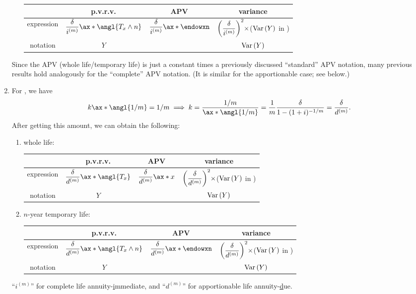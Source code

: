 \begin{enumerate}
\begin{enumerate}
\begin{tabular}{cccc}
\toprule
&p.v.r.v.&APV&variance\\
\midrule
expression&\(\displaystyle \frac{\delta}{i^{(m)}}\ax*{\angl{T_x\wedge n}}\)
&\(\displaystyle \frac{\delta}{i^{(m)}}\ax*{\endowxn}\)
&\(\displaystyle \qty(\frac{\delta}{i^{(m)}})^2\times\)(\(\operatorname{Var}\qty(Y)\) in {it:cts-tmp-annuity-fmlas})\\
notation&\(Y\)&{\(\aringx{\endowxn}[(m)]\)}&\(\operatorname{Var}\qty(Y)\)\\
\bottomrule
\end{tabular}
\end{enumerate}
\begin{note}
Since the APV (whole life/temporary life) is just a constant times a previously
discussed ``standard'' APV notation, many previous results hold analogously for
the ``complete'' APV notation.  (It is similar for the apportionable case; see
below.)
\end{note}

\item \label{it:apportionable-1m-annuity-fmlas}
For , we have
\[
k\ax*{\angl{1/m}}=1/m
\implies
k=\frac{1/m}{\ax*{\angl{1/m}}}
=\frac{1}{m}\frac{\delta}{1-(1+i)^{-1/m}}
=\frac{\delta}{d^{(m)}}.
\]
After getting this amount, we can obtain the following:
\begin{enumerate}
\item whole life:

\begin{tabular}{cccc}
\toprule
&p.v.r.v.&APV&variance\\
\midrule
expression&\(\displaystyle \frac{\delta}{d^{(m)}}\ax*{\angl{T_x}}\)
&\(\displaystyle \frac{\delta}{d^{(m)}}\ax*{x}\)
&\(\displaystyle \qty(\frac{\delta}{d^{(m)}})^2\times\)(\(\operatorname{Var}\qty(Y)\) in {it:cts-wl-annuity-fmlas})\\
notation&\(Y\)&{\(\ax**{x}[\{m\}]\)}&\(\operatorname{Var}\qty(Y)\)\\
\bottomrule
\end{tabular}

\item \(n\)-year temporary life:

\begin{tabular}{cccc}
\toprule
&p.v.r.v.&APV&variance\\
\midrule
expression&\(\displaystyle \frac{\delta}{d^{(m)}}\ax*{\angl{T_x\wedge n}}\)
&\(\displaystyle \frac{\delta}{d^{(m)}}\ax*{\endowxn}\)
&\(\displaystyle \qty(\frac{\delta}{d^{(m)}})^2\times\)(\(\operatorname{Var}\qty(Y)\) in {it:cts-tmp-annuity-fmlas})\\
notation&\(Y\)&{\(\ax**{\endowxn}[\{m\}]\)}&\(\operatorname{Var}\qty(Y)\)\\
\bottomrule
\end{tabular}
\end{enumerate}

\begin{mnemonic}
``\(i^{(m)}\)'' for complete life annuity-\underline{i}mmediate, and
``\(d^{(m)}\)'' for apportionable life annuity-\underline{d}ue.
\end{mnemonic}
\end{enumerate}

